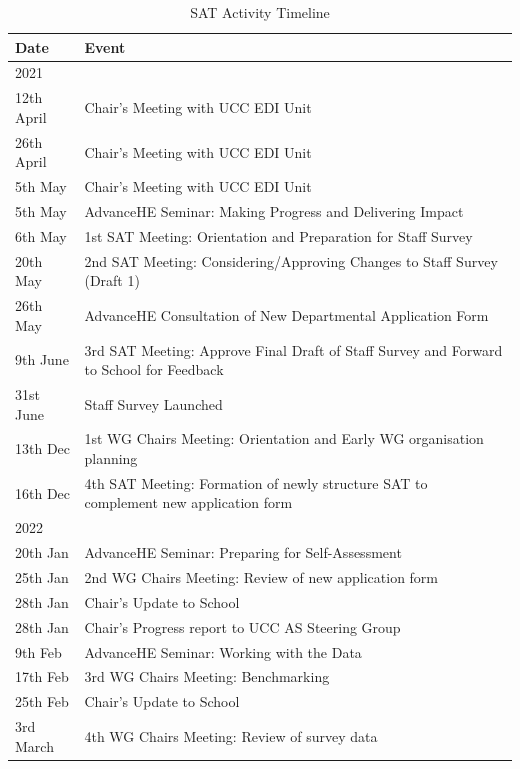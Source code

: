 \begin{table}[!t]

\colorbox{orangebg}{
      \begin{minipage}{14.3cm}
      
\footnotesize       
\caption{SAT Activity Timeline}
\label{tab:activitytimeline}


\begin{tabular}{p{2cm} 
                p{12.3cm}}
\toprule

Date & Event \\
\midrule
2021 \\
\midrule 
12th April	& Chair’s Meeting with UCC EDI Unit\\
26th April	& Chair’s Meeting with UCC EDI Unit\\
5th May	& Chair’s Meeting with UCC EDI Unit\\
5th May	& AdvanceHE Seminar: Making Progress and Delivering Impact\\
6th May	& 1st SAT Meeting: Orientation and Preparation for Staff Survey\\
20th May & 2nd SAT Meeting: Considering/Approving Changes to Staff Survey (Draft 1)\\
26th May &	AdvanceHE Consultation of New Departmental Application Form\\
9th June &	3rd SAT Meeting: Approve Final Draft of Staff Survey and Forward to School for Feedback\\
31st June &	Staff Survey Launched\\
13th Dec &	1st WG Chairs Meeting: Orientation and Early WG organisation planning\\
16th Dec &	4th SAT Meeting: Formation of newly structure SAT to complement new application form\\
\midrule 
2022	\\
\midrule 
20th Jan &	AdvanceHE Seminar: Preparing for Self-Assessment\\
25th Jan &	2nd WG Chairs Meeting: Review of new application form\\
28th Jan &	Chair’s Update to School\\
28th Jan &	Chair’s Progress report to UCC AS Steering Group\\
9th Feb	& AdvanceHE Seminar: Working with the Data\\
17th Feb &	3rd  WG Chairs Meeting: Benchmarking\\
25th Feb &	Chair’s Update to School\\
3rd March &	4th  WG Chairs Meeting: Review of survey data\\

\end{tabular}
\end{minipage}}
\end{table}
